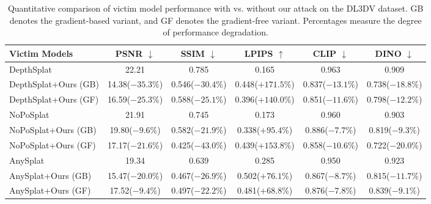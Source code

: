 \begin{table}[h]
\centering
\caption{Quantitative comparison of victim model performance with vs. without our attack on the DL3DV dataset. GB denotes the gradient-based variant, and GF denotes the gradient-free variant. Percentages measure the degree of performance degradation.}
\label{tab:dl3dv}
{\fontsize{7pt}{8pt}\selectfont
\begin{tabular}{l ccccc}
\toprule
Victim Models & \cellcolor{gray!20}PSNR $\downarrow$ & \cellcolor{gray!20}SSIM $\downarrow$ & \cellcolor{gray!20}LPIPS $\uparrow$ & \cellcolor{gray!20}CLIP $\downarrow$ & \cellcolor{gray!20}DINO $\downarrow$ \\
\midrule
DepthSplat           & 22.21 & 0.785 & 0.165 & 0.963 & 0.909 \\
DepthSplat+Ours (GB) & 14.38\textcolor[HTML]{B7282E}{\tiny($-35.3\%$)} & 0.546\textcolor[HTML]{B7282E}{\tiny($-30.4\%$)} & 0.448\textcolor[HTML]{B7282E}{\tiny($+171.5\%$)} & 0.837\textcolor[HTML]{B7282E}{\tiny($-13.1\%$)} & 0.738\textcolor[HTML]{B7282E}{\tiny($-18.8\%$)} \\
DepthSplat+Ours (GF) & 16.59\textcolor[HTML]{B7282E}{\tiny($-25.3\%$)} & 0.588\textcolor[HTML]{B7282E}{\tiny($-25.1\%$)} & 0.396\textcolor[HTML]{B7282E}{\tiny($+140.0\%$)} & 0.851\textcolor[HTML]{B7282E}{\tiny($-11.6\%$)} & 0.798\textcolor[HTML]{B7282E}{\tiny($-12.2\%$)} \\
\midrule
NoPoSplat            & 21.91 & 0.745 & 0.173 & 0.960 & 0.903 \\
NoPoSplat+Ours (GB)  & 19.80\textcolor[HTML]{B7282E}{\tiny($-9.6\%$)} & 0.582\textcolor[HTML]{B7282E}{\tiny($-21.9\%$)} & 0.338\textcolor[HTML]{B7282E}{\tiny($+95.4\%$)} & 0.886\textcolor[HTML]{B7282E}{\tiny($-7.7\%$)} & 0.819\textcolor[HTML]{B7282E}{\tiny($-9.3\%$)} \\
NoPoSplat+Ours (GF)  & 17.17\textcolor[HTML]{B7282E}{\tiny($-21.6\%$)} & 0.425\textcolor[HTML]{B7282E}{\tiny($-43.0\%$)} & 0.439\textcolor[HTML]{B7282E}{\tiny($+153.8\%$)} & 0.858\textcolor[HTML]{B7282E}{\tiny($-10.6\%$)} & 0.722\textcolor[HTML]{B7282E}{\tiny($-20.0\%$)} \\
\midrule
AnySplat             & 19.34 & 0.639 & 0.285 & 0.950 & 0.923 \\
AnySplat+Ours (GB)   & 15.47\textcolor[HTML]{B7282E}{\tiny($-20.0\%$)} & 0.467\textcolor[HTML]{B7282E}{\tiny($-26.9\%$)} & 0.502\textcolor[HTML]{B7282E}{\tiny($+76.1\%$)} & 0.867\textcolor[HTML]{B7282E}{\tiny($-8.7\%$)} & 0.815\textcolor[HTML]{B7282E}{\tiny($-11.7\%$)} \\
AnySplat+Ours (GF)   & 17.52\textcolor[HTML]{B7282E}{\tiny($-9.4\%$)} & 0.497\textcolor[HTML]{B7282E}{\tiny($-22.2\%$)} & 0.481\textcolor[HTML]{B7282E}{\tiny($+68.8\%$)} & 0.876\textcolor[HTML]{B7282E}{\tiny($-7.8\%$)} & 0.839\textcolor[HTML]{B7282E}{\tiny($-9.1\%$)} \\
\bottomrule
\end{tabular}%
}
\end{table}